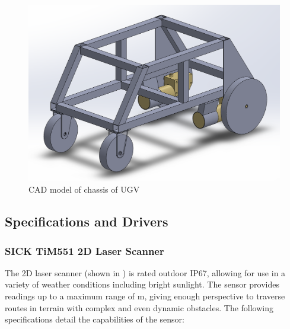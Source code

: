 \documentclass[titlepage,12pt,a4paper]{article}
\begin{document}
\begin{figure}[h!]
	\centering
	\includegraphics[scale=0.5]{figures/UGV.png}
	\caption{CAD model of chassis of UGV}
	\label{figure:ugv_chassis}
\end{figure}

\subsection{Specifications and Drivers}
\subsubsection{SICK TiM551 2D Laser Scanner}




The 2D laser scanner (shown in ) is rated outdoor IP67, allowing for use in a variety of weather conditions including bright sunlight. The sensor provides readings up to a maximum range of \unit[10]{m}, giving enough perspective to traverse routes in terrain with complex and even dynamic obstacles. The following specifications detail the capabilities of the sensor: 
\end{document}
